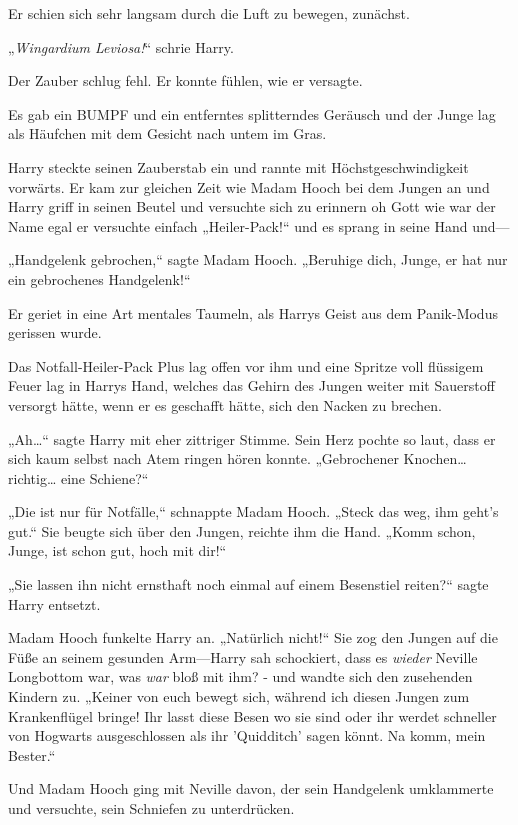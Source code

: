 {Er schien sich sehr langsam durch die Luft zu bewegen, zunächst.

„\emph{Wingardium Leviosa!}“ schrie Harry.

Der Zauber schlug fehl. Er konnte fühlen, wie er versagte.

Es gab ein BUMPF und ein entferntes splitterndes Geräusch und der Junge lag als Häufchen mit dem Gesicht nach untem im Gras.

Harry steckte seinen Zauberstab ein und rannte mit Höchstgeschwindigkeit vorwärts. Er kam zur gleichen Zeit wie Madam Hooch bei dem Jungen an und Harry griff in seinen Beutel und versuchte sich zu erinnern oh Gott wie war der Name egal er versuchte einfach „Heiler-Pack!“ und es sprang in seine Hand und—

„Handgelenk gebrochen,“ sagte Madam Hooch. „Beruhige dich, Junge, er hat nur ein gebrochenes Handgelenk!“

Er geriet in eine Art mentales Taumeln, als Harrys Geist aus dem Panik-Modus gerissen wurde.

Das Notfall-Heiler-Pack Plus lag offen vor ihm und eine Spritze voll flüssigem Feuer lag in Harrys Hand, welches das Gehirn des Jungen weiter mit Sauerstoff versorgt hätte, wenn er es geschafft hätte, sich den Nacken zu brechen.

„Ah…“ sagte Harry mit eher zittriger Stimme. Sein Herz pochte so laut, dass er sich kaum selbst nach Atem ringen hören konnte. „Gebrochener Knochen… richtig… eine Schiene?“

„Die ist nur für Notfälle,“ schnappte Madam Hooch. „Steck das weg, ihm geht's gut.“ Sie beugte sich über den Jungen, reichte ihm die Hand. „Komm schon, Junge, ist schon gut, hoch mit dir!“

„Sie lassen ihn nicht ernsthaft noch einmal auf einem Besenstiel reiten?“ sagte Harry entsetzt.

Madam Hooch funkelte Harry an. „Natürlich nicht!“ Sie zog den Jungen auf die Füße an seinem gesunden Arm—Harry sah schockiert, dass es \emph{wieder} Neville Longbottom war, was \emph{war} bloß mit ihm? - und wandte sich den zusehenden Kindern zu. „Keiner von euch bewegt sich, während ich diesen Jungen zum Krankenflügel bringe! Ihr lasst diese Besen wo sie sind oder ihr werdet schneller von Hogwarts ausgeschlossen als ihr 'Quidditch' sagen könnt. Na komm, mein Bester.“

Und Madam Hooch ging mit Neville davon, der sein Handgelenk umklammerte und versuchte, sein Schniefen zu unterdrücken.

}
